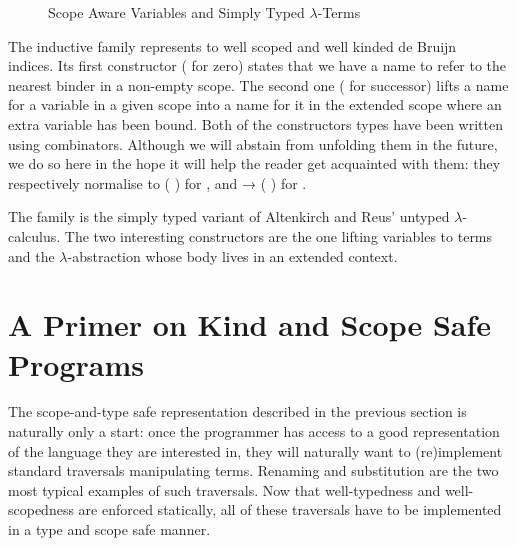 \begin{figure}[h]
\begin{minipage}{0.4\textwidth}
\end{minipage}
\begin{minipage}{0.5\textwidth}
\end{minipage}
\caption{Scope Aware Variables and Simply Typed $\lambda$-Terms\label{scoped-untyped}}
\end{figure}

The inductive family  represents to well scoped and well kinded
de Bruijn~\citeyear{de1972lambda}
indices. Its first constructor ( for zero) states that we have a name to refer to
the nearest binder in a non-empty scope. The second one ( for successor) lifts a
name for a variable in a given scope into a name for it in the extended scope where
an extra variable has been bound. Both of the constructors types have been written using combinators.
Although we will abstain from unfolding them in the future, we do so here in the hope
it will help the reader get acquainted with them: they respectively normalise to
{      ( \AIC{:\!:} )} for ,
and {    →       ( \AIC{:\!:} )} for .

The   family  is the simply typed variant of Altenkirch
and Reus' untyped $\lambda$-calculus. The two interesting constructors are the one
lifting variables to terms and the $\lambda$-abstraction whose body lives in an
extended context.




\section{A Primer on Kind and Scope Safe Programs}\label{section:primer-program}

The scope-and-type safe representation described in the previous section is
naturally only a start: once the programmer has access to a good
representation of the language they are interested in, they will naturally
want to (re)implement standard traversals manipulating terms.
Renaming and substitution are the two most typical examples
of such traversals. Now that well-typedness and well-scopedness are enforced
statically, all of these traversals have to be implemented
in a type and scope safe manner.

